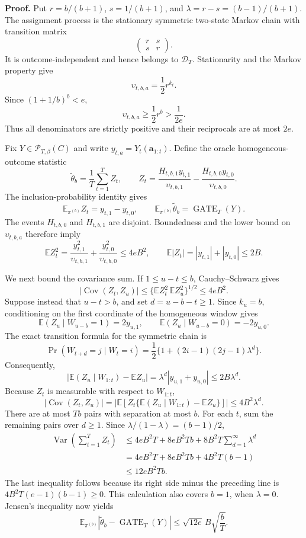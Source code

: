 \textbf{Proof.} Put \(r=b/(b+1)\), \(s=1/(b+1)\), and \(\lambda=r-s=(b-1)/(b+1)\). The assignment process is the stationary symmetric two-state Markov chain with transition matrix
\[
\begin{pmatrix}r&s\\s&r\end{pmatrix}.
\]
It is outcome-independent and hence belongs to \(\mathcal D_T\). Stationarity and the Markov property give
\[
\upsilon_{t,b,a}=\frac12r^{k_t}.
\]
Since \((1+1/b)^b<e\),
\[
\upsilon_{t,b,a}\ge \frac12r^b>\frac1{2e}.
\]
Thus all denominators are strictly positive and their reciprocals are at most \(2e\).

Fix \(Y\in\mathcal P_{T,\beta}(C)\) and write \(y_{t,a}=Y_t(\mathbf a_{1:t})\). Define the oracle homogeneous-outcome statistic
\[
\widetilde\theta_b=\frac1T\sum_{t=1}^T Z_t,
\qquad
Z_t=\frac{H_{t,b,1}y_{t,1}}{\upsilon_{t,b,1}}-\frac{H_{t,b,0}y_{t,0}}{\upsilon_{t,b,0}}.
\]
The inclusion-probability identity gives
\[
\mathbb E_{\pi^{(b)}}Z_t=y_{t,1}-y_{t,0},
\qquad
\mathbb E_{\pi^{(b)}}\widetilde\theta_b=\operatorname{GATE}_T(Y).
\]
The events \(H_{t,b,0}\) and \(H_{t,b,1}\) are disjoint. Boundedness and the lower bound on \(\upsilon_{t,b,a}\) therefore imply
\[
\mathbb E Z_t^2
=\frac{y_{t,1}^2}{\upsilon_{t,b,1}}+\frac{y_{t,0}^2}{\upsilon_{t,b,0}}
\le4eB^2,
\qquad
\mathbb E|Z_t|=|y_{t,1}|+|y_{t,0}|\le2B.
\]

We next bound the covariance sum. If \(1\le u-t\le b\), Cauchy--Schwarz gives
\[
|\operatorname{Cov}(Z_t,Z_u)|
\le\{\mathbb E Z_t^2\,\mathbb E Z_u^2\}^{1/2}
\le4eB^2.
\]
Suppose instead that \(u-t>b\), and set \(d=u-b-t\ge1\). Since \(k_u=b\), conditioning on the first coordinate of the homogeneous window gives
\[
\mathbb E(Z_u\mid W_{u-b}=1)=2y_{u,1},
\qquad
\mathbb E(Z_u\mid W_{u-b}=0)=-2y_{u,0}.
\]
The exact transition formula for the symmetric chain is
\[
\Pr(W_{t+d}=j\mid W_t=i)
=\frac12\{1+(2i-1)(2j-1)\lambda^d\}.
\]
Consequently,
\[
\left|\mathbb E(Z_u\mid W_{1:t})-\mathbb EZ_u\right|
=\lambda^d|y_{u,1}+y_{u,0}|
\le2B\lambda^d.
\]
Because \(Z_t\) is measurable with respect to \(W_{1:t}\),
\[
|\operatorname{Cov}(Z_t,Z_u)|
=\left|\mathbb E\left[Z_t\{\mathbb E(Z_u\mid W_{1:t})-\mathbb EZ_u\}\right]\right|
\le4B^2\lambda^d.
\]
There are at most \(Tb\) pairs with separation at most \(b\). For each \(t\), sum the remaining pairs over \(d\ge1\). Since \(\lambda/(1-\lambda)=(b-1)/2\),
\[
\begin{aligned}
\operatorname{Var}\left(\sum_{t=1}^T Z_t\right)
&\le4eB^2T+8eB^2Tb+8B^2T\sum_{d=1}^{\infty}\lambda^d\\
&=4eB^2T+8eB^2Tb+4B^2T(b-1)\\
&\le12eB^2Tb.
\end{aligned}
\]
The last inequality follows because its right side minus the preceding line is \(4B^2T(e-1)(b-1)\ge0\). This calculation also covers \(b=1\), when \(\lambda=0\). Jensen's inequality now yields
\[
\mathbb E_{\pi^{(b)}}\left|\widetilde\theta_b-\operatorname{GATE}_T(Y)\right|
\le\sqrt{12e}\,B\sqrt{\frac bT}.
\]

